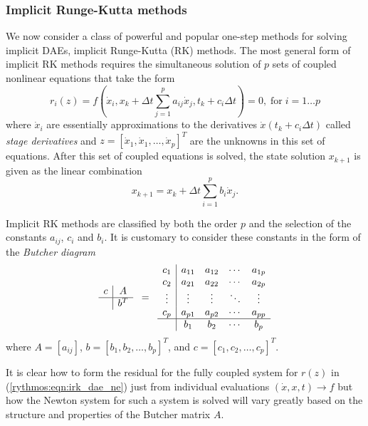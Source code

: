 \documentclass[pdf,ps2pdf,11pt]{SANDreport}
\begin{document}
\subsubsection{Implicit Runge-Kutta methods}
\label{rythmos:sec:implicit-rk}

We now consider a class of powerful and popular one-step methods for solving
implicit DAEs, implicit Runge-Kutta (RK) methods.  The most general form
of implicit RK methods requires the simultaneous solution of $p$ sets
of coupled nonlinear equations that take the form
%
\begin{equation}
r_i(z) = f\left( \dot{x}_i, x_k + \Delta t \sum_{j=1}^{p} a_{ij} \dot{x}_j,
t_k + c_i \Delta t \right) = 0,
\; \mbox{for} \; i = 1 \ldots p
\label{rythmos:eqn:irk_dae_ne}
\end{equation}
%
where $\dot{x}_i$ are essentially approximations to the derivatives
$\dot{x}(t_k + c_i \Delta t)$ called {}\textit{stage derivatives} and $z = [
{}\dot{x}_1, {}\dot{x}_1, {}\ldots, {}\dot{x}_p ]^T$ are the unknowns in this
set of equations.  After this set of coupled equations is solved, the state
solution $x_{k+1}$ is given as the linear combination
%
\begin{equation}
x_{k+1} = x_k + \Delta t \sum_{i=1}^{p} b_i \dot{x}_j.
\end{equation}

Implicit RK methods are classified by both the order $p$ and the selection of
the constants $a_{ij}$, $c_i$ and $b_i$.  It is customary to consider these
constants in the form of the {}\textit{Butcher diagram}
%
\[
\begin{array}{c|c}
c & A \\
\hline
  & b^T
\end{array}
\; \; = \; \;
\begin{array}{c|cccc}
c_1 & a_{11} & a_{12} & \cdots & a_{1p} \\
c_2 & a_{21} & a_{22} & \cdots & a_{2p} \\
\vdots & \vdots & \vdots & \ddots & \vdots \\
c_p & a_{p1} & a_{p2} & \cdots & a_{pp} \\
\hline
 & b_1 & b_2 & \cdots & b_p
\end{array}
\]
%
where $A = [a_{ij}]$, $b = [b_1, b_2, {}\ldots, b_p]^T$, and $c =
[c_1, c_2, {}\ldots, c_p]^T$.

It is clear how to form the residual for the fully coupled system for $r(z)$ in
(\ref{rythmos:eqn:irk_dae_ne}) just from individual evaluations $(\dot{x},x,t)
{}\rightarrow f$ but how the Newton system for such a system is solved will
vary greatly based on the structure and properties of the Butcher matrix $A$.
\end{document}
